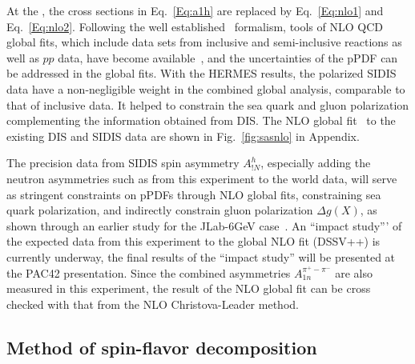 At the \nloo, the cross sections in Eq.~\ref{Eq:a1h}  are replaced by Eq.~\ref{Eq:nlo1}
and Eq.~\ref{Eq:nlo2}. Following the well established~\cite{DSSV2008} formalism, 
tools of NLO QCD global fits,
which include data sets from inclusive and semi-inclusive reactions as well as $pp$ data,
have become available~\cite{DSSV2008}, and the uncertainties of the pPDF 
can be addressed in the global fits.
With the HERMES results, the polarized SIDIS data 
have a non-negligible weight in the combined global analysis, 
comparable to that of inclusive data. It helped 
to constrain the sea quark and gluon polarization complementing 
the information obtained from DIS.
The NLO global fit~\cite{DSSV2008} to the existing DIS and SIDIS data are shown in Fig.~\ref{fig:sasnlo} in Appendix. 

The precision data from SIDIS spin asymmetry $A_{!N}^h$, especially adding the 
 neutron asymmetries such as from this experiment  to the world data,  
will serve as stringent constraints on pPDFs through NLO global fits, constraining sea quark polarization, and indirectly constrain gluon polarization $\Delta g(X)$, as shown through an earlier study for the JLab-6GeV case~\cite{Jiang:2006qc}.  
An ``impact study''' of the expected data from this experiment to the global NLO fit (DSSV++) is currently underway, the final results of the ``impact study'' will be presented at the PAC42 presentation.
Since the combined asymmetries $A_{1n}^{\pi^+ -\pi^-}$ 
are also measured in this experiment,  the result of the NLO global fit 
can be  cross checked with that from the NLO Christova-Leader method.

\subsection{Method of spin-flavor decomposition}

